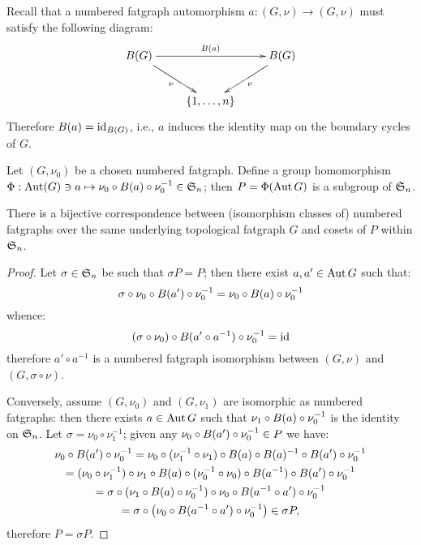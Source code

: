 Recall that a numbered fatgraph automorphism $a: (G,\nu) \to (G,\nu)$
must satisfy the following diagram:
\begin{equation*}
  \xymatrix{%
    \Holes{G} &  & \Holes{G}
    \\
    & \{ 1, \ldots, n \} &
    \ar^{\Holes{a}} "1,1";"1,3"
    \ar_{\nu} "1,1";"2,2"
    \ar^{\nu} "1,3";"2,2"
  }%
\end{equation*}
Therefore $B(a) = \operatorname{id}_{B(G)}$, i.e., $a$ induces the
identity map on the boundary cycles of $G$.

Let $(G, \nu_0)$ be a chosen numbered fatgraph.  Define a group
homomorphism $\Phi: \operatorname{Aut}(G) \ni a \mapsto \nu_0 \circ B(a) \circ
\nu_0^{-1} \in \mathfrak{S}_{n}$; then $P = \Phi(\operatorname{Aut} G)$ is a subgroup of
$\mathfrak{S}_{n}$.
\begin{lemma}\label{lemma:numberings}
  There is a bijective correspondence between (isomorphism classes of)
  numbered fatgraphs over the same underlying topological fatgraph $G$
  and cosets of $P$ within $\mathfrak{S}_{n}$.
\end{lemma}
\begin{proof}
  Let $\sigma \in \mathfrak{S}_{n}$ be such that $\sigma P = P$; then there
  exist $a, a' \in \operatorname{Aut} G$ such that:
  \begin{equation*}
    \sigma \circ \nu_0 \circ B(a') \circ \nu_0^{-1}
    = \nu_0 \circ B(a) \circ \nu_0^{-1}
  \end{equation*}
  whence:
  \begin{equation*}
    (\sigma \circ \nu_0) \circ B(a' \circ a^{-1}) \circ
    \nu_0^{-1} = \operatorname{id}
  \end{equation*}
  therefore $a' \circ a^{-1}$ is a numbered fatgraph isomorphism
  between $(G, \nu)$ and $(G, \sigma \circ \nu)$.

  Conversely, assume $(G, \nu_0)$ and $(G, \nu_1)$ are isomorphic as
  numbered fatgraphs: then there exists $a \in \operatorname{Aut} G$ such that
  $\nu_1 \circ B(a) \circ \nu_0^{-1}$ is the identity on
  $\mathfrak{S}_{n}$.  Let $\sigma = \nu_0 \circ \nu_1^{-1}$; given any $\nu_0
  \circ B(a') \circ \nu_0^{-1} \in P$ we have:
  \begin{multline*}
    \nu_0 \circ B(a') \circ \nu_0^{-1} 
    = \nu_0 \circ (\nu_1^{-1} \circ \nu_1) 
      \circ B(a) \circ B(a)^{-1}
      \circ B(a') \circ \nu_0^{-1} 
    \\
    = (\nu_0 \circ \nu_1^{-1}) \circ \nu_1 \circ B(a)
      \circ (\nu_0^{-1} \circ \nu_0) \circ B(a^{-1}) 
      \circ B(a') \circ \nu_0^{-1} 
    \\
    = \sigma \circ (\nu_1 \circ
      B(a) \circ \nu_0^{-1}) \circ \nu_0 \circ B(a^{-1} \circ
      a') \circ \nu_0^{-1}
    \\
    = \sigma \circ \left( \nu_0 \circ
      B(a^{-1} \circ a') \circ \nu_0^{-1} \right)
    \in \sigma P,
  \end{multline*}
  therefore $P = \sigma P$.
\end{proof}

